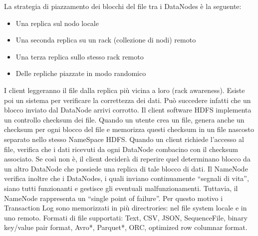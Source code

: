 \documentclass[a4page, 11pt]{article}
\begin{document}
La strategia di piazzamento dei blocchi del file tra i DataNodes è la seguente:
\begin{itemize}[noitemsep]
\item Una replica sul nodo locale
\item Una seconda replica su un rack (collezione di nodi) remoto
\item Una terza replica sullo stesso rack remoto
\item Delle repliche piazzate in modo randomico
\end{itemize}
I client leggeranno il file dalla replica più vicina a loro (rack awareness). Esiste poi un sistema per verificare la correttezza dei dati. Può succedere infatti che un blocco inviato dal DataNode arrivi corrotto. Il client software HDFS implementa un controllo checksum dei file. Quando un utente crea un file, genera anche un checksum per ogni blocco del file e memorizza questi checksum in un file nascosto separato nello stesso NameSpace HDFS. Quando un client richiede l’accesso al file, verifica che i dati ricevuti da ogni DataNode combacino con il checksum associato. Se così non è, il client deciderà di reperire quel determinano blocco da un altro DataNode che possiede una replica di tale blocco di dati. Il NameNode verifica inoltre che i DataNodes, i quali inviano continuamente “segnali di vita”, siano tutti funzionanti e gestisce gli eventuali malfunzionamenti. Tuttavia, il NameNode rappresenta un “single point of failure”. Per questo motivo i Transaction Log sono memorizzati in più directrories: nel file system locale e in uno remoto.\newline
Formati di file supportati: Text, CSV, JSON, SequenceFile, binary key/value pair format, Avro*, Parquet*, ORC, optimized row columnar format.
\end{document}
